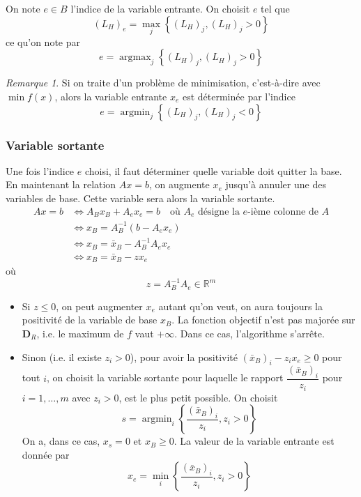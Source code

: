 \documentclass[a4paper,12pt,openany]{book}
\theoremstyle{plain}
\theoremstyle{definition}
\theoremstyle{remark}
\newtheorem{remarque}[theorem]{Remarque}
\theoremstyle{nbstyle}
\begin{document}
	On note $e \in B$ l'indice de la variable entrante. On choisit $e$ tel que
	\[
	(L_{H})_{e} = \displaystyle\max_{j} \left\{ (L_{H})_{j}, (L_{H})_{j} > 0 \right\}
	\]
	ce qu'on note par
	\[
	e = \operatorname{argmax}_{j} \left\{ (L_{H})_{j}, (L_{H})_{j} > 0 \right\}
	\]
	\begin{remarque}
		Si on traite d'un problème de minimisation, c'est-à-dire avec $\displaystyle\min f(x)$, alors la variable entrante $x_{e}$ est déterminée par l'indice
		\[
		e = \operatorname{argmin}_{j} \left\{ (L_{H})_{j}, (L_{H})_{j} < 0 \right\}
		\]
	\end{remarque}
	\label{rem:3.1}
	
	\subsubsection{Variable sortante}
	
	Une fois l'indice $e$ choisi, il faut déterminer quelle variable doit quitter la base. En maintenant la relation $A x = b$, on augmente $x_{e}$ jusqu'à annuler une des variables de base. Cette variable sera alors la variable sortante.
	\[
	\begin{aligned}
	A x = b &\Longleftrightarrow A_{B} x_{B} + A_{e} x_{e} = b \quad \text{où $A_{e}$ désigne la $e$-ième colonne de $A$} \\
	&\Longleftrightarrow x_{B} = A_{B}^{-1} (b - A_{e} x_{e}) \\
	&\Longleftrightarrow x_{B} = \bar{x}_{B} - A_{B}^{-1} A_{e} x_{e} \\
	&\Longleftrightarrow x_{B} = \bar{x}_{B} - z x_{e}
	\end{aligned}
	\]
	où
	\[
	z = A_{B}^{-1} A_{e} \in \mathbb{R}^{m}
	\]
	\begin{itemize}
		\item Si $z \leq 0$, on peut augmenter $x_{e}$ autant qu'on veut, on aura toujours la positivité de la variable de base $x_{B}$. La fonction objectif n'est pas majorée sur $\mathbf{D}_{R}$, i.e. le maximum de $f$ vaut $+\infty$. Dans ce cas, l'algorithme s'arrête.
		\item Sinon (i.e. il existe $z_{i} > 0$), pour avoir la positivité $(\bar{x}_{B})_{i} - z_{i} x_{e} \geq 0$ pour tout $i$, on choisit la variable sortante pour laquelle le rapport $\dfrac{(\bar{x}_{B})_{i}}{z_{i}}$ pour $i = 1, \ldots, m$ avec $z_{i} > 0$, est le plus petit possible. On choisit
		\[
		s = \operatorname{argmin}_{i} \left\{ \dfrac{(\bar{x}_{B})_{i}}{z_{i}}, z_{i} > 0 \right\}
		\]
		On a, dans ce cas, $x_{s} = 0$ et $x_{B} \geq 0$. La valeur de la variable entrante est donnée par
		\[
		x_{e} = \displaystyle\min_{i} \left\{ \dfrac{(\bar{x}_{B})_{i}}{z_{i}}, z_{i} > 0 \right\}
		\]
	\end{itemize}
	
\end{document}
